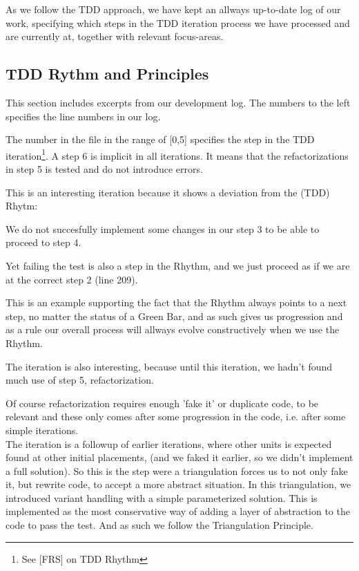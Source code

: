 As we follow the TDD approach,
we have kept an allways up-to-date log of our work, specifying which steps in the TDD iteration process we have processed and are currently at,
together with relevant focus-areas.


\subsection*{TDD Rythm and Principles}
This section includes excerpts from our development log. The numbers to the left specifies the line numbers in our log.

The number in the file in the range of [0,5] specifies the step in the TDD iteration\footnote{See [FRS] on TDD Rhythm}.
A step 6 is implicit in all iterations. It means that the refactorizations in step 5 is tested and do not introduce errors.


This is an interesting iteration because it shows a deviation from the (TDD) Rhytm:

We do not succesfully implement some changes in our step 3 to be able to proceed to step 4.

Yet failing the test is also a step in the Rhythm, and we just proceed as if we are at the correct step 2 (line 209).

This is an example supporting the fact that the Rhythm always points to a next step, no matter the status of a Green Bar, and as such gives us progression and as a rule our overall process will allways evolve constructively when we use the Rhythm.

The iteration is also interesting, because until this iteration, we hadn't found much use of step 5, refactorization.

Of course refactorization requires enough 'fake it' or duplicate code, to be relevant and these only comes after some progression in the code, i.e. after some simple iterations. \\

The iteration is a followup of earlier iterations, where other units is expected found at other initial placements, (and we faked it earlier, so we didn't implement a full solution).
So this is the step were a triangulation forces us to not only fake it, but rewrite code, to accept a more abstract situation.
In this triangulation, we introduced variant handling with a simple parameterized solution.
This is implemented as the most conservative way of adding a layer of abstraction to the code to pass the test.
And as such we follow the Triangulation Principle. \\




